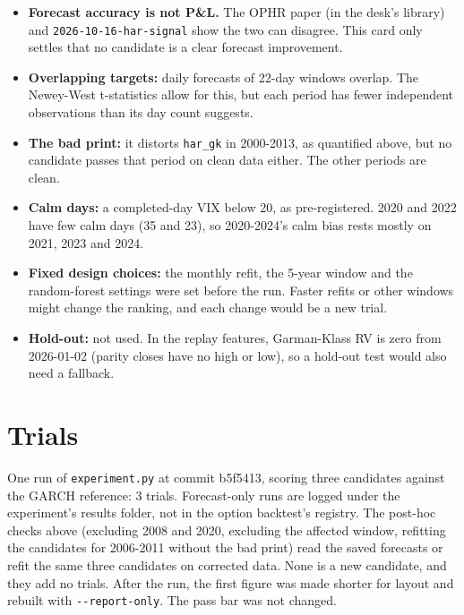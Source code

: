 \documentclass{article}
\begin{document}
\begin{itemize}

\item \textbf{Forecast accuracy is not P\&L.} The OPHR paper (in the desk's library) and \texttt{2026-\allowbreak{}10-\allowbreak{}16-\allowbreak{}har-\allowbreak{}signal} show the two can disagree. This card only settles that no candidate is a clear forecast improvement.

\item \textbf{Overlapping targets:} daily forecasts of 22-day windows overlap. The Newey-West t-statistics allow for this, but each period has fewer independent observations than its day count suggests.

\item \textbf{The bad print:} it distorts \texttt{har\_\allowbreak{}gk} in 2000-2013, as quantified above, but no candidate passes that period on clean data either. The other periods are clean.

\item \textbf{Calm days:} a completed-day VIX below 20, as pre-registered. 2020 and 2022 have few calm days (35 and 23), so 2020-2024's calm bias rests mostly on 2021, 2023 and 2024.

\item \textbf{Fixed design choices:} the monthly refit, the 5-year window and the random-forest settings were set before the run. Faster refits or other windows might change the ranking, and each change would be a new trial.

\item \textbf{Hold-out:} not used. In the replay features, Garman-Klass RV is zero from 2026-01-02 (parity closes have no high or low), so a hold-out test would also need a fallback.

\end{itemize}

\section{Trials}

One run of \texttt{experiment.\allowbreak{}py} at commit b5f5413, scoring three candidates against the GARCH reference: 3 trials. Forecast-only runs are logged under the experiment's results folder, not in the option backtest's registry. The post-hoc checks above (excluding 2008 and 2020, excluding the affected window, refitting the candidates for 2006-2011 without the bad print) read the saved forecasts or refit the same three candidates on corrected data. None is a new candidate, and they add no trials. After the run, the first figure was made shorter for layout and rebuilt with \texttt{-\allowbreak{}-\allowbreak{}report-\allowbreak{}only}. The pass bar was not changed.
\end{document}
